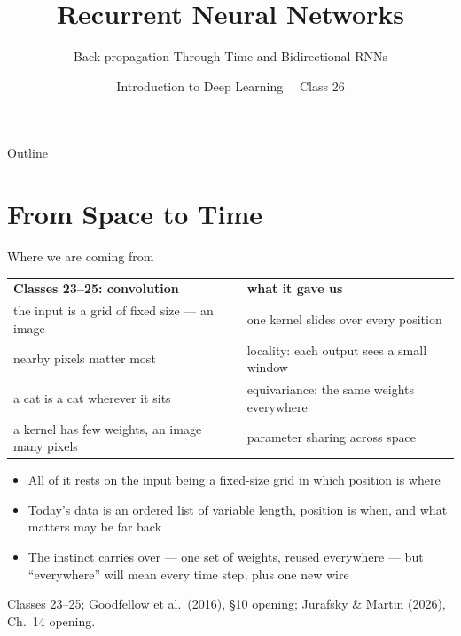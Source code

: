 \documentclass[aspectratio=169, 11pt]{beamer}
\title{Recurrent Neural Networks}
\subtitle{Back-propagation Through Time and Bidirectional RNNs}
\author{Introduction to Deep Learning \ \textperiodcentered\ Class 26}
\institute{}
\date{}
\newcommand{\srcline}[1]{%
  \par\vspace{0.25em}%
  {\scriptsize\color{mcMuted}\hfill #1\par}}
\begin{document}
\maketitle

\begin{frame}{Outline}
  \tableofcontents
\end{frame}

\section{From Space to Time}

\begin{frame}{Where we are coming from}
  \vspace{-0.3em}
  {\scriptsize
  \renewcommand{\arraystretch}{1.3}
  \begin{tabular}{@{}l@{\hspace{1.2em}}l@{}}
    \textbf{Classes 23--25: convolution} & \textbf{what it gave us}\\
    the input is a \alert{grid} of fixed size --- an image & one kernel slides over every position\\
    nearby pixels matter most & locality: each output sees a small window\\
    a cat is a cat wherever it sits & equivariance: the same weights everywhere\\
    a kernel has few weights, an image many pixels & parameter sharing across \alert{space}\\
  \end{tabular}}
  \vspace{0.4em}

  {\footnotesize
  \begin{itemize}\itemsep0.2em
    \item All of it rests on the input being a fixed-size grid in which
          position is \alert{where}
    \item Today's data is an \alert{ordered list of variable length},
          position is \alert{when}, and what matters may be far back
    \item The instinct carries over --- one set of weights, reused
          everywhere --- but ``everywhere'' will mean every \alert{time
          step}, plus one new wire
  \end{itemize}}
  \srcline{Classes 23--25; Goodfellow et al.\ (2016), \S10 opening; Jurafsky \& Martin (2026), Ch.~14 opening.}
\end{frame}
\end{document}
